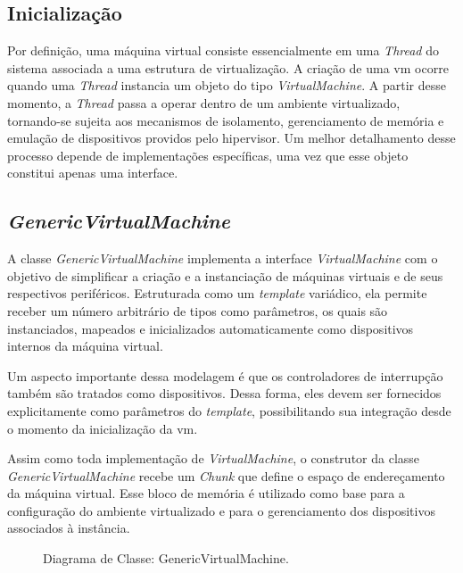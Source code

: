 \subsection{Inicialização}

Por definição, uma máquina virtual consiste essencialmente em uma \textit{Thread} do sistema associada a uma estrutura de virtualização.
A criação de uma \gls{vm} ocorre quando uma \textit{Thread} instancia um objeto do tipo \textit{VirtualMachine}. A partir desse momento, a \textit{Thread}
passa a operar dentro de um ambiente virtualizado, tornando-se sujeita aos mecanismos de isolamento, gerenciamento de memória e emulação de dispositivos
providos pelo hipervisor.
Um melhor detalhamento desse processo depende de implementações específicas, uma vez que esse objeto constitui apenas uma interface.

\subsection{\textit{GenericVirtualMachine}}

A classe \textit{GenericVirtualMachine} implementa a interface \textit{VirtualMachine} com o objetivo de simplificar a criação e a
instanciação de máquinas virtuais e de seus respectivos periféricos. Estruturada como um \textit{template} variádico, ela permite receber
um número arbitrário de tipos como parâmetros, os quais são instanciados, mapeados e inicializados automaticamente como dispositivos
internos da máquina virtual.

Um aspecto importante dessa modelagem é que os controladores de interrupção também são tratados como dispositivos. Dessa forma, eles
devem ser fornecidos explicitamente como parâmetros do \textit{template}, possibilitando sua integração desde o momento da inicialização
da \gls{vm}.

Assim como toda implementação de \textit{VirtualMachine}, o construtor da classe \textit{GenericVirtualMachine} recebe um \textit{Chunk}
que define o espaço de endereçamento da máquina virtual. Esse bloco de memória é utilizado como base para a configuração do ambiente
virtualizado e para o gerenciamento dos dispositivos associados à instância.

\begin{figure}[h]
    \centering
    \caption{Diagrama de Classe: GenericVirtualMachine.}
    \label{fig:class-generic-virtual-machine}
\end{figure}

